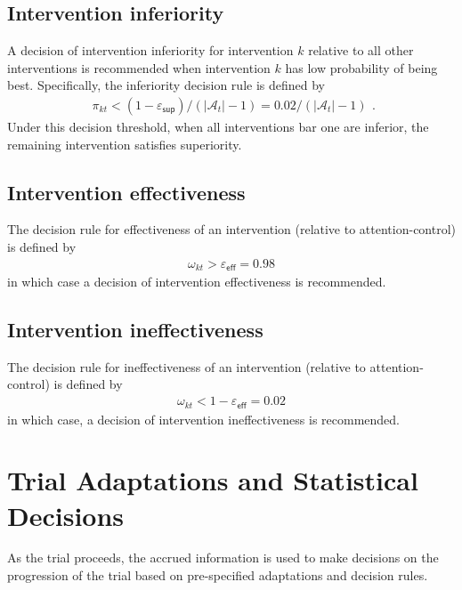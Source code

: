 \documentclass[11pt,parskip=half-]{scrartcl}
\begin{document}
\subsection{Intervention inferiority}\label{trinterventioneatment-inferiority}

A decision of intervention inferiority for intervention $k$ relative to all other interventions is recommended when intervention $k$ has low probability of being best. Specifically, the inferiority decision rule is defined by
$$
  \begin{aligned}
    \pi_{kt} < (1 - \varepsilon_{\mathsf{sup}}) / (|\mathcal{A}_t| - 1) = 0.02 / (|\mathcal{A}_t| - 1)
  \end{aligned}.
$$
Under this decision threshold, when all interventions bar one are inferior, the remaining intervention satisfies superiority.

\subsection{Intervention effectiveness}\label{intervention-effectiveness}

The decision rule for effectiveness of an intervention (relative to attention-control) is defined by
$$
  \begin{aligned}
    \omega_{kt} > \varepsilon_{\mathsf{eff}} = 0.98
  \end{aligned}
$$
in which case a decision of intervention effectiveness is recommended.

\subsection{Intervention ineffectiveness}\label{intervention-ineffectiveness}

The decision rule for ineffectiveness of an intervention (relative to attention-control) is defined by
$$
  \begin{aligned}
    \omega_{kt} < 1 - \varepsilon_{\mathsf{eff}} = 0.02
  \end{aligned}
$$
in which case, a decision of intervention ineffectiveness is recommended.

\clearpage

\section{Trial Adaptations and Statistical Decisions}\label{trial-adaptations-and-statistical-decisions}

As the trial proceeds, the accrued information is used to make decisions on the progression of the trial based on pre-specified adaptations and decision rules.
\end{document}
